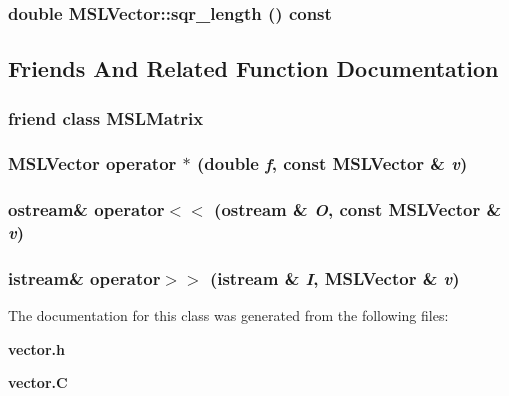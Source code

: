 \subsubsection{\setlength{\rightskip}{0pt plus 5cm}double MSLVector::sqr\_\-length () const}\label{classMSLVector_a13}




\subsection{Friends And Related Function Documentation}
\subsubsection{\setlength{\rightskip}{0pt plus 5cm}friend class MSLMatrix\hspace{0.3cm}{\tt  [friend]}}\label{classMSLVector_l0}


\subsubsection{\setlength{\rightskip}{0pt plus 5cm}MSLVector operator $\ast$ (double {\em f}, const MSLVector \& {\em v})\hspace{0.3cm}{\tt  [friend]}}\label{classMSLVector_l1}


\subsubsection{\setlength{\rightskip}{0pt plus 5cm}ostream\& operator$<$$<$ (ostream \& {\em O}, const MSLVector \& {\em v})\hspace{0.3cm}{\tt  [friend]}}\label{classMSLVector_l2}


\subsubsection{\setlength{\rightskip}{0pt plus 5cm}istream\& operator$>$$>$ (istream \& {\em I}, MSLVector \& {\em v})\hspace{0.3cm}{\tt  [friend]}}\label{classMSLVector_l3}




The documentation for this class was generated from the following files:\begin{CompactItemize}
\item 
{\bf vector.h}\item 
{\bf vector.C}\end{CompactItemize}
